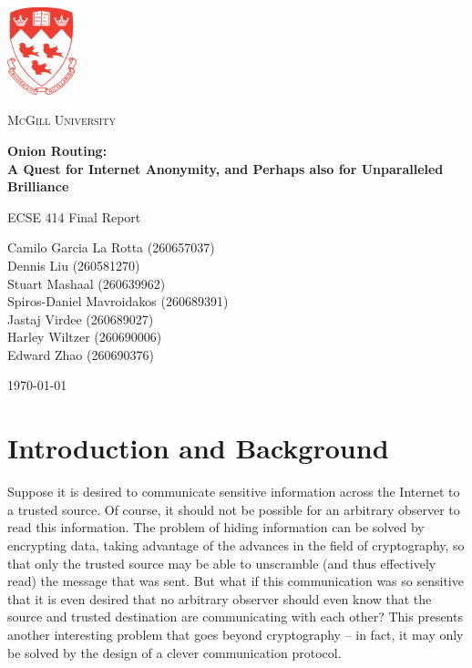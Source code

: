 \documentclass[10pt]{report}
\begin{document}
\begin{titlepage}
    \begin{center}
        \includegraphics[width=0.15\textwidth]{McGill.pdf}~\par\vspace{1cm}
        {\scshape\LARGE McGill University \par}
        \vspace{1cm}
        {\huge\bfseries Onion Routing:\\A Quest for Internet Anonymity, and Perhaps also for Unparalleled Brilliance\par}
        \vspace{1.5cm}
        {\Large ECSE 414 Final Report\par}
        \vspace{2cm}
        {\Large Camilo Garcia La Rotta (260657037)\\}
        {\Large Dennis Liu (260581270)\\}
        {\Large Stuart Mashaal (260639962)\\}
        {\Large Spiros-Daniel Mavroidakos (260689391)\\}
        {\Large Jastaj Virdee (260689027)\\}
        {\Large Harley Wiltzer (260690006)\\}
        {\Large Edward Zhao (260690376)\\}
        \vfill
        {\large \today\par}
    \end{center}
\end{titlepage}

\tableofcontents

\doublespacing


\chapter{Introduction and Background}
Suppose it is desired to communicate sensitive information across the Internet to a trusted source.
Of course, it should not be possible for an arbitrary observer to read this information. The problem
of hiding information can be solved by encrypting data, taking advantage of the advances in the
field of cryptography, so that only the trusted source may be able to unscramble (and thus
effectively read) the message that was sent. But what if this communication was so sensitive that it
is even desired that no arbitrary observer should even know that the source and trusted destination
are communicating with each other? This presents another interesting problem that goes beyond
cryptography -- in fact, it may only be solved by the design of a clever communication protocol.\\
\end{document}
